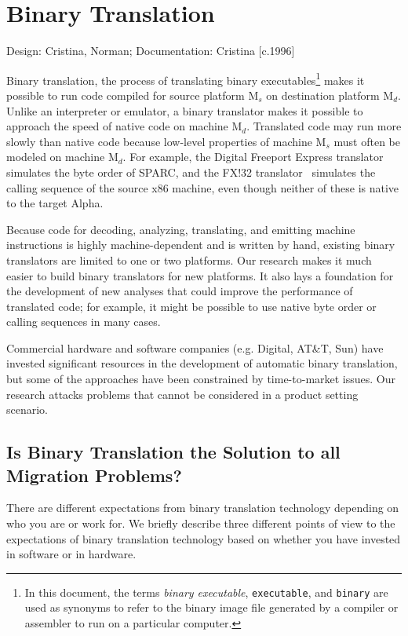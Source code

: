 
\chapter{Binary Translation}
\label{ch-bintrans}

{\small
\begin{flushright}
Design: Cristina, Norman; Documentation: Cristina [c.1996]
\end{flushright} 
}


Binary translation, the process of translating binary executables\footnote{
In this document, the terms \emph{binary executable}, \texttt{executable},
and \texttt{binary} are used as synonyms to refer to the binary image
file generated by a compiler or assembler to run on a particular 
computer.
} makes it possible to run code compiled for source
platform M$_s$ on destination platform M$_d$.  Unlike an interpreter or
emulator, a binary translator makes it possible to approach the speed
of native code on machine M$_d$.  Translated code may run more slowly than
native code because low-level properties of machine M$_s$ must often be
modeled on machine M$_d$.  For example, the Digital Freeport Express
translator~\cite{Dec95} simulates the byte order of SPARC, and the FX!32 
translator~\cite{Thom96,Hook97} simulates the calling sequence of the 
source x86 machine, even though neither of these is native to the target 
Alpha.

Because code for decoding, analyzing, translating, and emitting
machine instructions is highly machine-dependent and is written by
hand, existing binary translators are limited to one or two platforms.
Our research makes it much easier to build binary translators for new 
platforms.  It also lays a foundation for the development of new analyses 
that could improve the performance of translated code; for example, it 
might be possible to use native byte order or calling sequences in 
many cases.

Commercial hardware and software companies (e.g. Digital, AT\&T, Sun) 
have invested significant resources in the development of
automatic binary translation, but some of the approaches have been
constrained by time-to-market issues.  Our research attacks  
problems that cannot be considered in a product setting scenario.


\section{Is Binary Translation the Solution to all Migration Problems?}
There are different expectations from binary translation technology 
depending on who you are or work for.  We briefly describe three 
different points of view to the expectations of binary translation
technology based on whether you have invested in software or in hardware.

